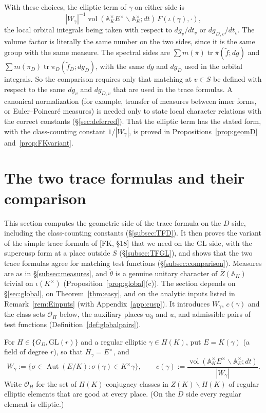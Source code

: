 \documentclass[12pt]{article}
\newcommand{\ov}[1]{\overline{#1}}
\newcommand{\A}{\mathbb{A}}
\newcommand{\tr}{\operatorname{tr}}
\newcommand{\Aut}{\operatorname{Aut}}
\newcommand{\vol}{\operatorname{vol}}
\newcommand{\GL}{\mathrm{GL}}
\newcommand{\Zb}{\ov{Z}}
\newcommand{\pib}{\ov{\pi}}
\theoremstyle{plain}
\theoremstyle{definition}
\begin{document}
With these choices, the elliptic term of $\gamma$ on either side is \[ |W_\gamma|^{-1}\vol(\A_K^\times E^\times\backslash\A_E^\times;dt)\,F(\iota(\gamma),\cdot), \] the local orbital integrals being taken with respect to $dg_v/dt_v$ or $dg_{D,v}/dt_v$. The volume factor is literally the same number on the two sides, since it is the same group with the same measure. The spectral sides are $\sum m(\pib)\tr\pib(\tilde f;dg)$ and $\sum m(\pib_D)\tr\pib_D(\tilde f_D;dg_D)$, with the same $dg$ and $dg_D$ used in the orbital integrals. So the comparison requires only that matching at $v\in S$ be defined with respect to the same $dg_v$ and $dg_{D,v}$ that are used in the trace formulas. A canonical normalization (for example, transfer of measures between inner forms, or Euler--Poincar\'e measures) is needed only to state local character relations with the correct constants (\S\ref{sec:deferred}). That the elliptic term has the stated form, with the class-counting constant $1/|W_\gamma|$, is proved in Propositions~\ref{prop:geomD} and~\ref{prop:FKvariant}.

\section{The two trace formulas and their comparison}\label{sec:TF}
This section computes the geometric side of the trace formula on the $D$ side, including the class-counting constants (\S\ref{subsec:TFD}). It then proves the variant of the simple trace formula of [FK, \S18] that we need on the $\GL$ side, with the supercusp form at a place outside $S$ (\S\ref{subsec:TFGL}), and shows that the two trace formulas agree for matching test functions (\S\ref{subsec:comparison}). Measures are as in \S\ref{subsec:measures}, and $\tilde\theta$ is a genuine unitary character of $\Zb(\A_K)$ trivial on $\iota(K^\times)$ (Proposition~\ref{prop:global}(c)). The section depends on \S\ref{sec:global}, on Theorem~\ref{thm:easy}, and on the analytic inputs listed in Remark~\ref{rem:Einputs} (with Appendix~\ref{app:cusp}). It introduces $W_\gamma$, $c(\gamma)$ and the class sets $\mathcal O_H$ below, the auxiliary places $w_0$ and $u$, and admissible pairs of test functions (Definition~\ref{def:globalpairs}).

For $H\in\{G_D,\GL(r)\}$ and a regular elliptic $\gamma\in H(K)$, put $E=K(\gamma)$ (a field of degree $r$), so that $H_\gamma=E^\times$, and
\[ W_\gamma:=\{\sigma\in\Aut(E/K):\sigma(\gamma)\in K^\times\gamma\},\qquad c(\gamma):=\frac{\vol(\A_K^\times E^\times\backslash\A_E^\times;dt)}{|W_\gamma|}. \]
Write $\mathcal O_H$ for the set of $H(K)$-conjugacy classes in $Z(K)\backslash H(K)$ of regular elliptic elements that are good at every place. (On the $D$ side every regular element is elliptic.)
\end{document}
